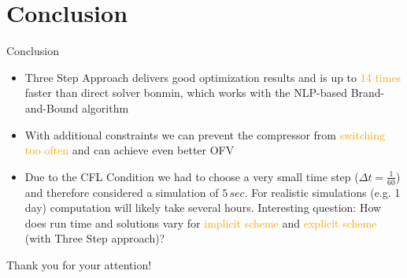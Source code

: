 \documentclass[8pt]{beamer}
\begin{document}
\section{Conclusion}
\begin{frame}{Conclusion}
\begin{itemize}
\item Three Step Approach delivers good optimization results and is up to \textcolor{orange}{14 times} faster than direct solver bonmin, which works with the NLP-based Brand-and-Bound algorithm
\item With additional constraints we can prevent the compressor from \textcolor{orange}{switching too often} and can achieve even better OFV
\item Due to the CFL Condition we had to choose a very small time step ($\Delta t = \frac{1}{60}$) and therefore considered a simulation of $5 \,  sec$.  For realistic simulations (e.g. 1 day) computation will likely take several hours.  \newline
Interesting question: How does run time and solutions vary for \textcolor{orange}{implicit scheme} and \textcolor{orange}{explicit scheme} (with Three Step approach)?
\end{itemize}
\end{frame}

\begin{frame}
\begin{center}
Thank you for your attention!
\end{center}
\end{frame}
\end{document}
